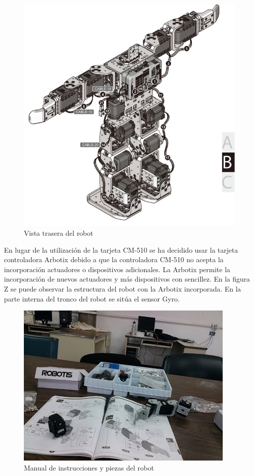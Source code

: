 \begin{figure}[hbtp]
\centering
\includegraphics[scale=0.4]{imagenes/RobotTrasero.png}
\caption{Vista trasera del robot}
\end{figure}

En lugar de la utilización de la tarjeta CM-510 se ha decidido usar la tarjeta controladora Arbotix debido a que la controladora CM-510 no acepta la incorporación actuadores o dispositivos adicionales. La Arbotix permite la incorporación de nuevos actuadores y más dispositivos con sencillez. En la figura Z se puede observar la estructura del robot con la Arbotix incorporada. En la parte interna del tronco del robot se sitúa el sensor Gyro.

\begin{figure}[hbtp]
\centering
\includegraphics[scale=0.7]{imagenes/CIMG0225.jpg}
\caption{Manual de instrucciones y piezas del robot}
\end{figure}

